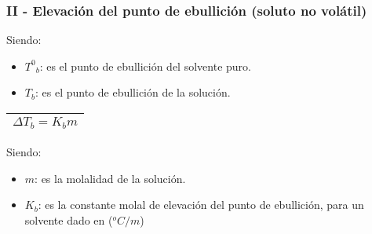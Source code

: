         \subsubsection{II - Elevación del punto de ebullición (soluto no volátil)}
            Siendo:
            \begin{itemize}
                \item ${T^0}_{b}$: es el punto de ebullición del solvente puro.
                \item $T_b$: es el punto de ebullición de la solución.
            \end{itemize}
            \begin{center}
                \begin{tabular}{|m{5cm}|}
                    \toprule
                    \multicolumn{1}{|c|}{$\Delta T_b = K_b m$} \\
                    \bottomrule
                \end{tabular}
            \end{center}
            Siendo:
            \begin{itemize}
                \item $m$: es la molalidad de la solución.
                \item $K_b$: es la constante molal de elevación del punto de ebullición, para un solvente dado en ($\text{}^oC/m$)
            \end{itemize}
